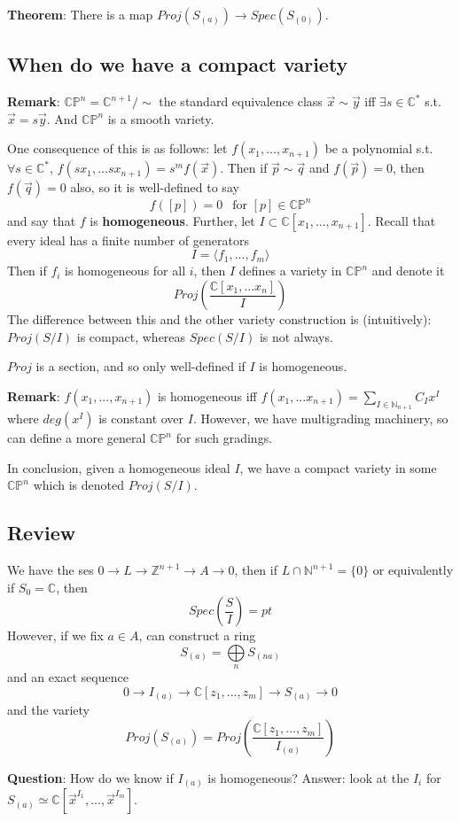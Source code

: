 \documentclass{article}
\newcommand{\C}{\mathbb{C}}
\newcommand{\CP}{\mathbb{C P}}
\newcommand{\N}{\mathbb{N}}
\newcommand{\Z}{\mathbb{Z}}
\begin{document}
		\noindent\textbf{Theorem}: There is a map $Proj(S_{(a)})\to
		Spec(S_{(0)})$. 
	\subsection{When do we have a compact variety}
		\noindent\textbf{Remark}: $\CP^n=\C^{n+1}/\sim$ the standard equivalence class 
		$\vec{x}\sim\vec{y}$ iff $\exists s\in\C^*$ s.t. $\vec{x}=s\vec{y}$. 
		And $\CP^n$ is a smooth variety. 
		
		One consequence of this is as follows: let $f(x_1,...,x_{n+1})$ 
		be a polynomial s.t. $\forall s\in\C^*$, $f(sx_1,...sx_{n+1})=
		s^mf(\vec{x})$. Then if $\vec{p}\sim\vec{q}$ and $f(\vec{p})=0$, 
		then $f(\vec{q})=0$ also, so it is well-defined to say 
		$$f([p])=0~~\text{ for }[p]\in\CP^n$$ and say that 
		$f$ is \textbf{homogeneous}. 
		Further, let $I\subset\C[x_1,...,x_{n+1}]$. 
		Recall that every ideal has a finite number of generators 
		$$I=\langle f_1,...,f_m\rangle$$
		Then if $f_i$ is homogeneous for all $i$, then $I$ defines a 
		variety in $\CP^n$ and denote it 
		$$Proj\left(\frac{\C[x_1,...x_n]}{I}\right)$$
		The difference between this and the other variety 
		construction is (intuitively): 
		$Proj(S/I)$ is compact, whereas $Spec(S/I)$ is not always. 

		$Proj$ is a section, and so only well-defined if $I$ is 
		homogeneous. 

		\noindent\textbf{Remark}: $f(x_1,...,x_{n+1})$ is homogeneous 
		iff $f(x_1,...x_{n+1})=\sum\limits_{I\in\N_{n+1}}C_Ix^I$ where 
		$deg(x^I)$ is constant over $I$. However, we have multigrading 
		machinery, so can define a more general $\CP^n$ for such 
		gradings. 

		In conclusion, given a homogeneous ideal $I$, we have a 
		compact variety in some $\CP^n$ which is denoted $Proj(S/I)$. 

	\subsection{Review}
		We have the ses $0\to L\to\Z^{n+1}\to A\to0$, then if 
		$L\cap\N^{n+1}=\{0\}$ or equivalently if $S_0=\C$, then 
		$$Spec\left(\frac{S}{I}\right)=pt$$
		However, if we fix $a\in A$, can construct a ring 
		$$S_{(a)}=\bigoplus\limits_n S_{(na)}$$ and an 
		exact sequence $$0\to I_{(a)}\to\C[z_1,...,z_m]\to S_{(a)}\to0$$ 
		and the variety 
		$$Proj(S_{(a)})=Proj\left(\frac{\C[z_1,...,z_m]}{I_{(a)}}\right)$$

		\noindent\textbf{Question}: How do we know if $I_{(a)}$ is 
		homogeneous? Answer: look at the $I_i$ for $S_{(a)}\simeq
		\C[\vec{x}^{I_1},...,\vec{x}^{I_m}]$. 
\end{document}
